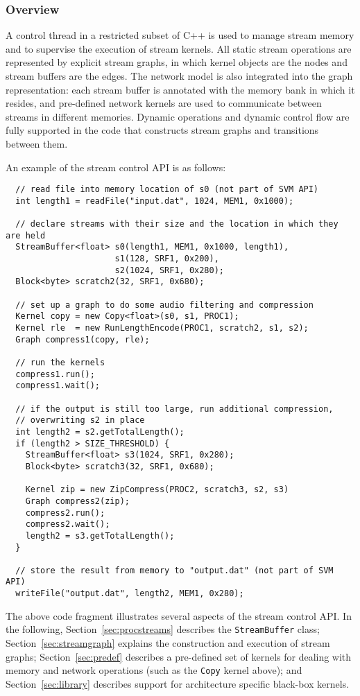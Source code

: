 \subsubsection{Overview}
\label{sec:streamover}

A control thread in a restricted subset of C++ is used to manage
stream memory and to supervise the execution of stream kernels.  All
static stream operations are represented by explicit stream graphs, in
which kernel objects are the nodes and stream buffers are the edges.
The network model is also integrated into the graph representation:
each stream buffer is annotated with the memory bank in which it
resides, and pre-defined network kernels are used to communicate
between streams in different memories.  Dynamic operations and dynamic
control flow are fully supported in the code that constructs stream
graphs and transitions between them.

An example of the stream control API is as follows:
{\small
\begin{verbatim}
  // read file into memory location of s0 (not part of SVM API)
  int length1 = readFile("input.dat", 1024, MEM1, 0x1000);

  // declare streams with their size and the location in which they are held
  StreamBuffer<float> s0(length1, MEM1, 0x1000, length1), 
                      s1(128, SRF1, 0x200), 
                      s2(1024, SRF1, 0x280);
  Block<byte> scratch2(32, SRF1, 0x680);

  // set up a graph to do some audio filtering and compression
  Kernel copy = new Copy<float>(s0, s1, PROC1);
  Kernel rle  = new RunLengthEncode(PROC1, scratch2, s1, s2);
  Graph compress1(copy, rle);

  // run the kernels
  compress1.run();
  compress1.wait();

  // if the output is still too large, run additional compression, 
  // overwriting s2 in place
  int length2 = s2.getTotalLength();
  if (length2 > SIZE_THRESHOLD) {
    StreamBuffer<float> s3(1024, SRF1, 0x280);
    Block<byte> scratch3(32, SRF1, 0x680);
    
    Kernel zip = new ZipCompress(PROC2, scratch3, s2, s3)
    Graph compress2(zip);
    compress2.run();
    compress2.wait();
    length2 = s3.getTotalLength();
  }

  // store the result from memory to "output.dat" (not part of SVM API)
  writeFile("output.dat", length2, MEM1, 0x280);
\end{verbatim}}
The above code fragment illustrates several aspects of the stream
control API.  In the following, Section~\ref{sec:procstreams}
describes the {\tt StreamBuffer} class; Section~\ref{sec:streamgraph}
explains the construction and execution of stream graphs;
Section~\ref{sec:predef} describes a pre-defined set of kernels for
dealing with memory and network operations (such as the {\tt Copy}
kernel above); and Section~\ref{sec:library} describes support for
architecture specific black-box kernels.

